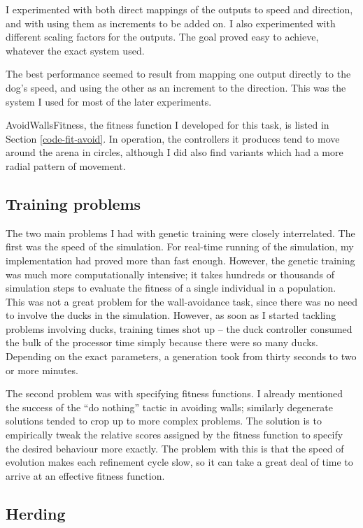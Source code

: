 \documentclass[a4paper]{report}
\newcommand{\code}[1]{{\ttfamily #1}}
\begin{document}
I experimented with both direct mappings of the outputs to speed and
direction, and with using them as increments to be added on. I also
experimented with different scaling factors for the outputs. The goal
proved easy to achieve, whatever the exact system used.

The best performance seemed to result from mapping one output directly
to the dog's speed, and using the other as an increment to the
direction. This was the system I used for most of the later
experiments.

\code{AvoidWallsFitness}, the fitness function I developed for this
task, is listed in Section \ref{code-fit-avoid}. In operation, the
controllers it produces tend to move around the arena in circles,
although I did also find variants which had a more radial pattern of
movement.

\subsection{Training problems}

\label{res-training-problems} The two main problems I had with genetic
training were closely interrelated. The first was the speed of the
simulation. For real-time running of the simulation, my implementation
had proved more than fast enough. However, the genetic training was
much more computationally intensive; it takes hundreds or thousands of
simulation steps to evaluate the fitness of a single individual in a
population. This was not a great problem for the wall-avoidance task,
since there was no need to involve the ducks in the simulation.
However, as soon as I started tackling problems involving ducks,
training times shot up -- the duck controller consumed the bulk of the
processor time simply because there were so many ducks. Depending on
the exact parameters, a generation took from thirty seconds to two or
more minutes.

The second problem was with specifying fitness functions. I already
mentioned the success of the ``do nothing'' tactic in avoiding walls;
similarly degenerate solutions tended to crop up to more complex
problems. The solution is to empirically tweak the relative scores
assigned by the fitness function to specify the desired behaviour more
exactly. The problem with this is that the speed of evolution makes each
refinement cycle slow, so it can take a great deal of time to arrive
at an effective fitness function.

\subsection{Herding}
\end{document}
